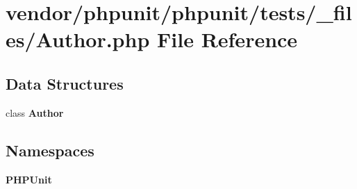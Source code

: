 \section{vendor/phpunit/phpunit/tests/\+\_\+files/\+Author.php File Reference}
\label{phpunit_2phpunit_2tests_2__files_2_author_8php}
\subsection*{Data Structures}
\begin{DoxyCompactItemize}
\item 
class {\bf Author}
\end{DoxyCompactItemize}
\subsection*{Namespaces}
\begin{DoxyCompactItemize}
\item 
 {\bf P\+H\+P\+Unit}
\end{DoxyCompactItemize}
